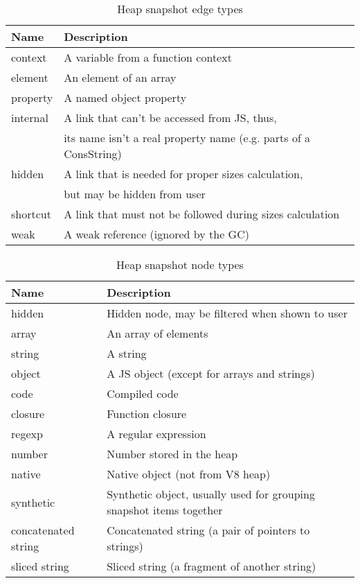 		\begin{table}[!htbp]
			\centering
			\begin{tabular}{|l||l|}
				\hline
				\textbf{Name}			&	\textbf{Description} 												\\ \hline \hline
		   	 		context				&	A variable from a function context									\\ \hline
		   			element				&	An element of an array												\\ \hline
		   			property			&	A named object property												\\ \hline
		   			internal			&	A link that can't be accessed from JS, thus, 						\\
										&	its name isn't a real property name (e.g. parts of a ConsString)	\\ \hline
					hidden				&	A link that is needed for proper sizes calculation, 				\\
										&	but may be hidden from user											\\ \hline
					shortcut			&	A link that must not be followed during	sizes calculation			\\ \hline
					weak				&	A weak reference (ignored by the GC)								\\ \hline
			\end{tabular}
			\caption{Heap snapshot edge types}
			\label{tap:heap_snapshot_edge_types}
		\end{table}
		
		\begin{table}[!htbp]
			\centering
			\begin{tabular}{|l||l|}
				\hline
				\textbf{Name}			&	\textbf{Description} 												\\ \hline \hline
		   	 		hidden				&	Hidden node, may be filtered when shown to user						\\ \hline
		   			array				&	An array of elements												\\ \hline
		   			string				&	A string															\\ \hline
		   			object				&	A JS object (except for arrays and strings)							\\ \hline
					code				&	Compiled code														\\ \hline
					closure				&	Function closure													\\ \hline
					regexp				&	A regular expression												\\ \hline
					number				&	Number stored in the heap											\\ \hline
		   			native				&	Native object (not from V8 heap)									\\ \hline
		   			synthetic			&	Synthetic object, usually used for grouping snapshot items together	\\ \hline
		   			concatenated string	&	Concatenated string (a pair of pointers to strings)					\\ \hline
		   			sliced string		&	Sliced string (a fragment of another string)						\\ \hline
			\end{tabular}
			\caption{Heap snapshot node types}
			\label{tap:heap_snapshot_node_types}
		\end{table}
		

